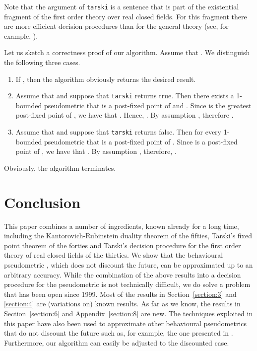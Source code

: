 \documentclass{LMCS}
\begin{document}
Note that the argument of {\tt tarski} is a sentence that is part of
the existential fragment of the first order theory over real closed fields.
For this fragment there are more efficient decision procedures than
for the general theory (see, for example, \cite{SPR96:jacm}).  

Let us sketch a correctness proof of our algorithm.  Assume that
.  We distinguish the following
three cases.
\begin{enumerate}[]
\item
If , then the algorithm obviously returns the
desired result.
\item
Assume that  and suppose that
{\tt tarski}
returns true.  Then there exists a 1-bounded pseudometric  that is 
a post-fixed point of  and .  Since 
is the greatest post-fixed point of , we have that .
Hence, .  By assumption
, therefore .
\item
Assume that  and suppose that {\tt tarski}
returns false.  Then  for every 1-bounded
pseudometric  that is a post-fixed point of .  Since 
is a post-fixed point of , we have that .  By assumption ,
therefore, .
\end{enumerate}
Obviously, the algorithm terminates.

\section{Conclusion}

This paper combines a number of ingredients, known already for a long time, 
including the Kantorovich-Rubinstein duality theorem of the fifties, 
Tarski's fixed point theorem of the forties and Tarski's decision procedure 
for the first order theory of real closed fields of the thirties.
We show that the behavioural pseudometric , which does not discount 
the future, can be approximated up to an arbitrary accuracy.  While the 
combination of the above results into a decision procedure for the 
pseudometric is not technically difficult, we do solve a problem that has 
been open since 1999.  Most of the results in Section~\ref{section:3} and 
\ref{section:4} are (variations on) known results.  As far as we know, 
the results in Section~\ref{section:6} and Appendix~\ref{section:8} are new.
The techniques exploited in this paper have also been used to
approximate other behavioural pseudometrics that do not discount the
future such as, for example, the one presented in \cite{B05:concur}.
Furthermore, our algorithm can easily be adjusted to the discounted
case.  
\end{document}
